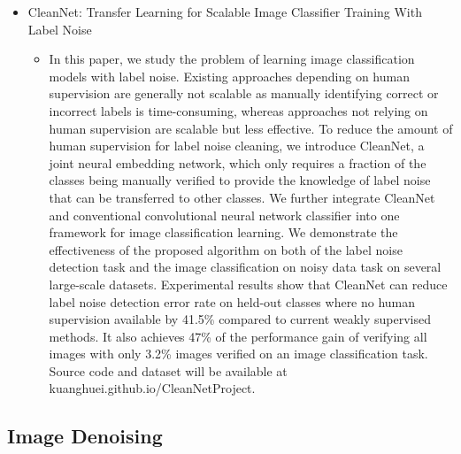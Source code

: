 \documentclass[12pt]{article}
\begin{document}
\begin{itemize}
\item CleanNet: Transfer Learning for Scalable Image Classifier Training
  With Label Noise \cite{Lee_2018_CVPR}
  \begin{itemize}
  \item In this paper, we study the problem of learning image
    classification models with label noise. Existing approaches
    depending on human supervision are generally not scalable as
    manually identifying correct or incorrect labels is time-consuming,
    whereas approaches not relying on human supervision are scalable but
    less effective. To reduce the amount of human supervision for label
    noise cleaning, we introduce CleanNet, a joint neural embedding network,
    which only requires a fraction of the classes being manually verified to
    provide the knowledge of label noise that can be transferred to other
    classes. We further integrate CleanNet and conventional convolutional
    neural network classifier into one framework for image classification
    learning. We demonstrate the effectiveness of the proposed algorithm on
    both of the label noise detection task and the image classification
    on noisy data task on several large-scale datasets. Experimental
    results show that CleanNet can reduce label noise detection error
    rate on held-out classes where no human supervision available by
    41.5\% compared to current weakly supervised methods. It also
    achieves 47\% of the performance gain of verifying all images with
    only 3.2\% images verified on an image classification task. Source
    code and dataset will be available at kuanghuei.github.io/CleanNetProject.
  \end{itemize}
\end{itemize}

\subsection{Image Denoising}
\end{document}
